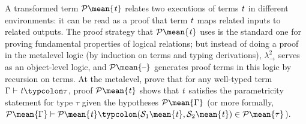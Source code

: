 A transformed term \ensuremath{\mathcal{P}\mean{\Varid{t}}} relates two executions of terms \ensuremath{\Varid{t}} in different
environments: it can be read as a proof that term \ensuremath{\Varid{t}} maps related inputs to
related outputs. The proof strategy that \ensuremath{\mathcal{P}\mean{\Varid{t}}}
uses is the standard one for proving fundamental properties of logical relations;
but instead of doing a proof in the metalevel logic (by induction on terms and
typing derivations), \ensuremath{\lambda_{\to}^2} serves as an object-level logic, and \ensuremath{\mathcal{P}\mean{\text{\textendash}}}
generates proof terms in this logic by recursion on terms. At the metalevel,
\citeauthor[Th. 3]{Bernardy2011realizability} prove that for any well-typed term
\ensuremath{\Gamma\vdash\Varid{t}\typcolon\tau}, proof \ensuremath{\mathcal{P}\mean{\Varid{t}}} shows that \ensuremath{\Varid{t}} satisfies the parametricity statement
for type \ensuremath{\tau} given the hypotheses \ensuremath{\mathcal{P}\mean{\Gamma}} (or more formally,
\ensuremath{\mathcal{P}\mean{\Gamma}\vdash\mathcal{P}\mean{\Varid{t}}\typcolon(\mathcal{S}_1 \mean{\Varid{t}},\mathcal{S}_2 \mean{\Varid{t}})\in \mathcal{P}\mean{\tau}}).
